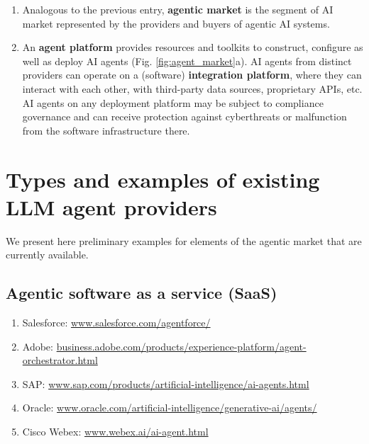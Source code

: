 \documentclass[11pt]{article}
\begin{document}
\begin{enumerate}[wide, labelindent=0pt, itemsep=0pt, topsep=1pt]
    \item[\textbullet] Analogous to the previous entry, \textbf{agentic market} is the segment of AI market represented by the providers and buyers of agentic AI systems.
    \item[\textbullet] An \textbf{agent platform} provides resources and toolkits to construct, configure as well as deploy AI agents (Fig. \ref{fig:agent_market}a). AI agents from distinct providers can operate on a (software) \textbf{integration platform}, where they can interact with each other, with third-party data sources, proprietary APIs, etc. AI agents on any deployment platform may be subject to compliance governance and can receive protection against cyberthreats or malfunction from the software infrastructure there.
\end{enumerate}


\section{Types and examples of existing LLM agent providers}
\label{sec:providers}

We present here preliminary examples for elements of the agentic market that are currently available.

\subsection{Agentic software as a service (SaaS)}
\begin{enumerate}[wide, labelindent=0pt, itemsep=-1pt, topsep=1pt]
    \item[\textbullet] Salesforce: \href{https://www.salesforce.com/agentforce/}{www.salesforce.com/agentforce/} 
    \item[\textbullet] Adobe: \href{https://business.adobe.com/products/experience-platform/agent-orchestrator.html}{business.adobe.com/products/experience-platform/agent-orchestrator.html}
    \item[\textbullet] SAP: \href{https://www.sap.com/products/artificial-intelligence/ai-agents.html}{www.sap.com/products/artificial-intelligence/ai-agents.html}
    \item[\textbullet] Oracle: \href{https://www.oracle.com/artificial-intelligence/generative-ai/agents/}{www.oracle.com/artificial-intelligence/generative-ai/agents/}
    \item[\textbullet] Cisco Webex: \href{https://www.webex.ai/ai-agent.html}{www.webex.ai/ai-agent.html}
\end{enumerate}
\end{document}
